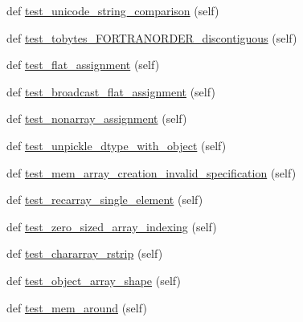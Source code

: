 \begin{DoxyCompactItemize}
\item 
def \hyperlink{classnumpy_1_1core_1_1tests_1_1test__regression_1_1TestRegression_ab6be1f519add832945459421e0e0d57d}{test\+\_\+unicode\+\_\+string\+\_\+comparison} (self)
\item 
def \hyperlink{classnumpy_1_1core_1_1tests_1_1test__regression_1_1TestRegression_aafdb2ab487166c4a00256923fb7a76a1}{test\+\_\+tobytes\+\_\+\+F\+O\+R\+T\+R\+A\+N\+O\+R\+D\+E\+R\+\_\+discontiguous} (self)
\item 
def \hyperlink{classnumpy_1_1core_1_1tests_1_1test__regression_1_1TestRegression_ae74e3b83a636f2584aa21f5ba1bd6f4e}{test\+\_\+flat\+\_\+assignment} (self)
\item 
def \hyperlink{classnumpy_1_1core_1_1tests_1_1test__regression_1_1TestRegression_a47fccc90ab983e5a70546abf78d0964c}{test\+\_\+broadcast\+\_\+flat\+\_\+assignment} (self)
\item 
def \hyperlink{classnumpy_1_1core_1_1tests_1_1test__regression_1_1TestRegression_aac0292474c2be111ecfbe78a887351db}{test\+\_\+nonarray\+\_\+assignment} (self)
\item 
def \hyperlink{classnumpy_1_1core_1_1tests_1_1test__regression_1_1TestRegression_a86bd604a6fce4a15d3e522b8da215717}{test\+\_\+unpickle\+\_\+dtype\+\_\+with\+\_\+object} (self)
\item 
def \hyperlink{classnumpy_1_1core_1_1tests_1_1test__regression_1_1TestRegression_af75b28ff86dc22b2853302f12dcb9cd2}{test\+\_\+mem\+\_\+array\+\_\+creation\+\_\+invalid\+\_\+specification} (self)
\item 
def \hyperlink{classnumpy_1_1core_1_1tests_1_1test__regression_1_1TestRegression_a20d6d411dcb6bcd3af19df3577315029}{test\+\_\+recarray\+\_\+single\+\_\+element} (self)
\item 
def \hyperlink{classnumpy_1_1core_1_1tests_1_1test__regression_1_1TestRegression_a83d83208285ea887cdc7c223e70d07b3}{test\+\_\+zero\+\_\+sized\+\_\+array\+\_\+indexing} (self)
\item 
def \hyperlink{classnumpy_1_1core_1_1tests_1_1test__regression_1_1TestRegression_ab75e964bb5d00ece62cbfe6fe026e95b}{test\+\_\+chararray\+\_\+rstrip} (self)
\item 
def \hyperlink{classnumpy_1_1core_1_1tests_1_1test__regression_1_1TestRegression_ad17b38e9d9ce59128a54ff7568bfa978}{test\+\_\+object\+\_\+array\+\_\+shape} (self)
\item 
def \hyperlink{classnumpy_1_1core_1_1tests_1_1test__regression_1_1TestRegression_aa7add8c05b2e0256f83f72cb56acc677}{test\+\_\+mem\+\_\+around} (self)

\end{DoxyCompactItemize}
